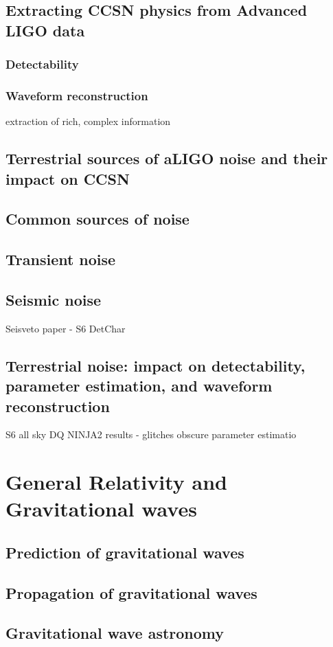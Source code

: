 \subsection{Extracting CCSN physics from Advanced LIGO data} 
\subsubsection{Detectability} 
\subsubsection{Waveform reconstruction}
extraction of rich, complex information

\subsection{Terrestrial sources of aLIGO noise and their impact on CCSN}
\subsection{Common sources of noise} 
\subsection{Transient noise}
\subsection{Seismic noise}
Seisveto paper - S6 DetChar 
\subsection{Terrestrial noise: impact on detectability, parameter estimation, and waveform reconstruction }
S6 all sky DQ 
NINJA2 results - glitches obscure parameter estimatio


%
\section{General Relativity and Gravitational waves} 
\subsection{Prediction of gravitational waves} 
\subsection{Propagation of gravitational waves}
\subsection{Gravitational wave astronomy}

